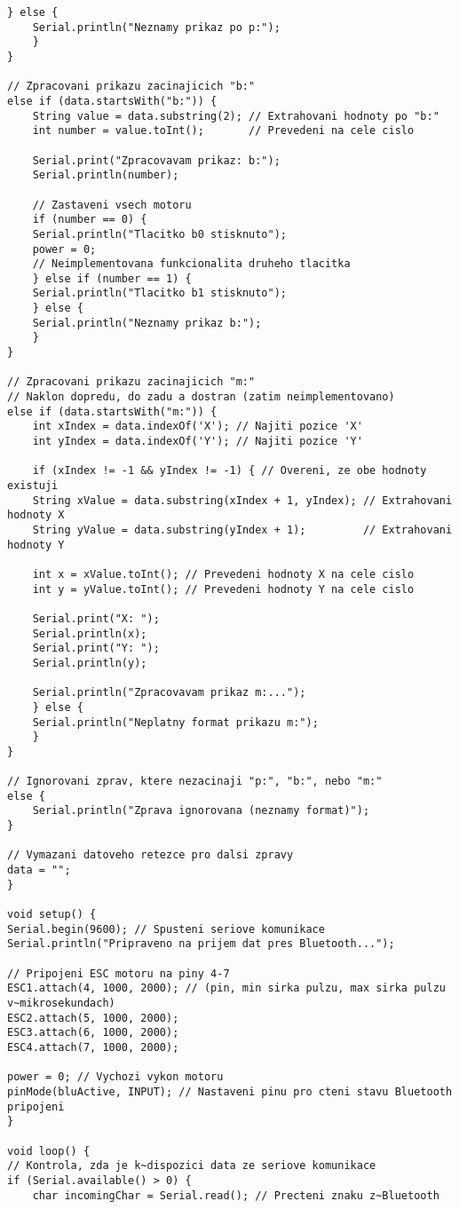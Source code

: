 \documentclass[12pt]{report}
\begin{document}
\begin{appendices}
\begin{lstlisting}[title={}, caption={}, label={}, basicstyle=\footnotesize\ttfamily, inputencoding=utf8]
	} else {
	Serial.println("Neznamy prikaz po p:");
	}
}

// Zpracovani prikazu zacinajicich "b:"
else if (data.startsWith("b:")) {
	String value = data.substring(2); // Extrahovani hodnoty po "b:"
	int number = value.toInt();       // Prevedeni na cele cislo

	Serial.print("Zpracovavam prikaz: b:");
	Serial.println(number);

	// Zastaveni vsech motoru
	if (number == 0) {
	Serial.println("Tlacitko b0 stisknuto");
	power = 0;
	// Neimplementovana funkcionalita druheho tlacitka
	} else if (number == 1) {
	Serial.println("Tlacitko b1 stisknuto");
	} else {
	Serial.println("Neznamy prikaz b:");
	}
}

// Zpracovani prikazu zacinajicich "m:"
// Naklon dopredu, do zadu a dostran (zatim neimplementovano)
else if (data.startsWith("m:")) {
	int xIndex = data.indexOf('X'); // Najiti pozice 'X'
	int yIndex = data.indexOf('Y'); // Najiti pozice 'Y'

	if (xIndex != -1 && yIndex != -1) { // Overeni, ze obe hodnoty existuji
	String xValue = data.substring(xIndex + 1, yIndex); // Extrahovani hodnoty X
	String yValue = data.substring(yIndex + 1);         // Extrahovani hodnoty Y

	int x = xValue.toInt(); // Prevedeni hodnoty X na cele cislo
	int y = yValue.toInt(); // Prevedeni hodnoty Y na cele cislo

	Serial.print("X: ");
	Serial.println(x);
	Serial.print("Y: ");
	Serial.println(y);

	Serial.println("Zpracovavam prikaz m:...");
	} else {
	Serial.println("Neplatny format prikazu m:");
	}
}

// Ignorovani zprav, ktere nezacinaji "p:", "b:", nebo "m:"
else {
	Serial.println("Zprava ignorovana (neznamy format)");
}

// Vymazani datoveho retezce pro dalsi zpravy
data = "";
}

void setup() {
Serial.begin(9600); // Spusteni seriove komunikace
Serial.println("Pripraveno na prijem dat pres Bluetooth...");

// Pripojeni ESC motoru na piny 4-7
ESC1.attach(4, 1000, 2000); // (pin, min sirka pulzu, max sirka pulzu v~mikrosekundach)
ESC2.attach(5, 1000, 2000);
ESC3.attach(6, 1000, 2000);
ESC4.attach(7, 1000, 2000);

power = 0; // Vychozi vykon motoru
pinMode(bluActive, INPUT); // Nastaveni pinu pro cteni stavu Bluetooth pripojeni
}

void loop() {
// Kontrola, zda je k~dispozici data ze seriove komunikace
if (Serial.available() > 0) {
	char incomingChar = Serial.read(); // Precteni znaku z~Bluetooth


\end{lstlisting}
\end{appendices}
\end{document}

